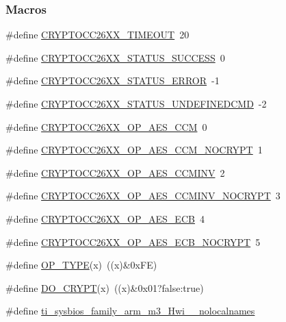 \subsubsection*{Macros}
\begin{DoxyCompactItemize}
\item 
\#define \hyperlink{_crypto_c_c26_x_x_8h_a8a94999f3768d815e26ac50a0debeeb0}{C\+R\+Y\+P\+T\+O\+C\+C26\+X\+X\+\_\+\+T\+I\+M\+E\+O\+U\+T}~20
\item 
\#define \hyperlink{_crypto_c_c26_x_x_8h_aaebc21d7bb5269638a64ff57f2b758aa}{C\+R\+Y\+P\+T\+O\+C\+C26\+X\+X\+\_\+\+S\+T\+A\+T\+U\+S\+\_\+\+S\+U\+C\+C\+E\+S\+S}~0
\item 
\#define \hyperlink{_crypto_c_c26_x_x_8h_a077508dd42d5999244911edc61f63194}{C\+R\+Y\+P\+T\+O\+C\+C26\+X\+X\+\_\+\+S\+T\+A\+T\+U\+S\+\_\+\+E\+R\+R\+O\+R}~-\/1
\item 
\#define \hyperlink{_crypto_c_c26_x_x_8h_a32adca418e15c3d66ec8a1b3dfa9f4d8}{C\+R\+Y\+P\+T\+O\+C\+C26\+X\+X\+\_\+\+S\+T\+A\+T\+U\+S\+\_\+\+U\+N\+D\+E\+F\+I\+N\+E\+D\+C\+M\+D}~-\/2
\item 
\#define \hyperlink{_crypto_c_c26_x_x_8h_a6ab0b59b64c06856c431f91a7e43b34d}{C\+R\+Y\+P\+T\+O\+C\+C26\+X\+X\+\_\+\+O\+P\+\_\+\+A\+E\+S\+\_\+\+C\+C\+M}~0
\item 
\#define \hyperlink{_crypto_c_c26_x_x_8h_acc1c159d62112b90da86ecd846994f98}{C\+R\+Y\+P\+T\+O\+C\+C26\+X\+X\+\_\+\+O\+P\+\_\+\+A\+E\+S\+\_\+\+C\+C\+M\+\_\+\+N\+O\+C\+R\+Y\+P\+T}~1
\item 
\#define \hyperlink{_crypto_c_c26_x_x_8h_a38c8bce4f77947e99d2d877e8d3dee7e}{C\+R\+Y\+P\+T\+O\+C\+C26\+X\+X\+\_\+\+O\+P\+\_\+\+A\+E\+S\+\_\+\+C\+C\+M\+I\+N\+V}~2
\item 
\#define \hyperlink{_crypto_c_c26_x_x_8h_a445002cd50ecda94d48f437bc213a499}{C\+R\+Y\+P\+T\+O\+C\+C26\+X\+X\+\_\+\+O\+P\+\_\+\+A\+E\+S\+\_\+\+C\+C\+M\+I\+N\+V\+\_\+\+N\+O\+C\+R\+Y\+P\+T}~3
\item 
\#define \hyperlink{_crypto_c_c26_x_x_8h_a9e96510f981e65f0c46c19684daaff07}{C\+R\+Y\+P\+T\+O\+C\+C26\+X\+X\+\_\+\+O\+P\+\_\+\+A\+E\+S\+\_\+\+E\+C\+B}~4
\item 
\#define \hyperlink{_crypto_c_c26_x_x_8h_aea29a252e094057f90d0fccd938b8a0d}{C\+R\+Y\+P\+T\+O\+C\+C26\+X\+X\+\_\+\+O\+P\+\_\+\+A\+E\+S\+\_\+\+E\+C\+B\+\_\+\+N\+O\+C\+R\+Y\+P\+T}~5
\item 
\#define \hyperlink{_crypto_c_c26_x_x_8h_ab17446955616908dd2c48c2ca50ceb63}{O\+P\+\_\+\+T\+Y\+P\+E}(x)~((x)\&0x\+F\+E)
\item 
\#define \hyperlink{_crypto_c_c26_x_x_8h_ac6c19e9fb605c1240013a59e8d15f21d}{D\+O\+\_\+\+C\+R\+Y\+P\+T}(x)~((x)\&0x01?false\+:true)
\item 
\#define \hyperlink{_crypto_c_c26_x_x_8h_aaa17ecf48f5762e2e1bdb0bab8aacf0c}{ti\+\_\+sysbios\+\_\+family\+\_\+arm\+\_\+m3\+\_\+\+Hwi\+\_\+\+\_\+nolocalnames}
\end{DoxyCompactItemize}
